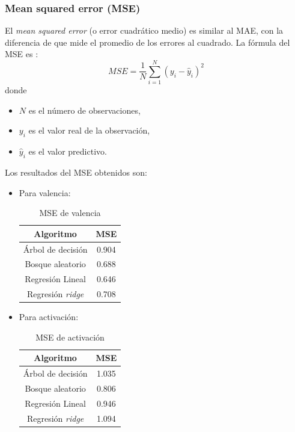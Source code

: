 \documentclass[12pt,a4paper]{article}
\begin{document}
\subsubsection{Mean squared error (MSE)}
El \textit{mean squared error} (o error cuadrático medio) es similar al MAE, con la diferencia de que mide el promedio de los errores al cuadrado. La fórmula del MSE es \cite{eswiki:159951880}:
\begin{equation}
	MSE = \frac{1}{N} \sum_{i=1}^{N} (y_i - \hat{y}_i)^{2}
\end{equation}
donde
\begin{itemize}
	\item $N$ es el número de observaciones,
	\item $y_i$ es el valor real de la observación,
	\item $\hat{y}_i$ es el valor predictivo.
\end{itemize}

Los resultados del MSE obtenidos son:
\begin{itemize}
	\item Para valencia:
	\begin{table}[H]
		\centering
		\caption{MSE de valencia}
		\label{tab:msevalencia}
		\begin{tabular}{|c|c|}
			\hline
			\textbf{Algoritmo} & \textbf{MSE} \\
			\hline
			Árbol de decisión & 0.904 \\
			Bosque aleatorio & 0.688 \\
			Regresión Lineal & 0.646 \\
			Regresión \textit{ridge} & 0.708 \\
			\hline
		\end{tabular}
	\end{table}
	\item Para activación:
	\begin{table}[H]
		\centering
		\caption{MSE de activación}
		\label{tab:mseactivacion}
		\begin{tabular}{|c|c|}
			\hline
			\textbf{Algoritmo} & \textbf{MSE} \\
			\hline
			Árbol de decisión & 1.035 \\
			Bosque aleatorio & 0.806 \\
			Regresión Lineal & 0.946 \\
			Regresión \textit{ridge} & 1.094 \\
			\hline
		\end{tabular}
	\end{table}
\end{itemize}
\end{document}
